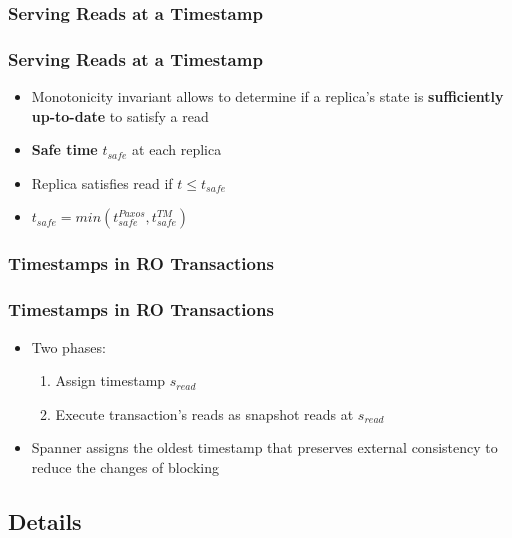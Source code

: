 \documentclass{beamer}
\begin{document}
\subsubsection{Serving Reads at a Timestamp}
\begin{frame}
  \frametitle{Serving Reads at a Timestamp}
  \begin{itemize}
    \item{Monotonicity invariant allows to determine if a replica's state is
      \textbf{sufficiently up-to-date} to satisfy a read
    }
    \item{\textbf{Safe time} $t_{safe}$ at each replica}
    \item{Replica satisfies read if $t \leq t_{safe}$}
    \item{$t_{safe} = min\left(t^{Paxos}_{safe}, t^{TM}_{safe}\right)$}
  \end{itemize}
\end{frame}

\subsubsection{Timestamps in RO Transactions}
\begin{frame}
  \frametitle{Timestamps in RO Transactions}
  \begin{itemize}
    \item{Two phases:}
    \begin{enumerate}
      \item{Assign timestamp $s_{read}$}
      \item{Execute transaction's reads as snapshot reads at $s_{read}$}
    \end{enumerate}
    \item{Spanner assigns the oldest timestamp that preserves external consistency
      to reduce the changes of blocking
    }
  \end{itemize}
\end{frame}

\subsection{Details}
\end{document}

